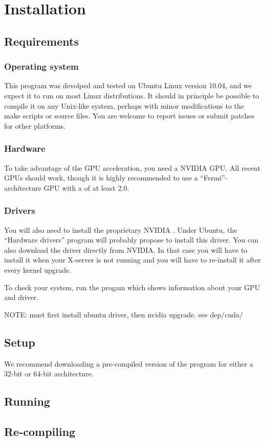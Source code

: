 \section{Installation}

\subsection{Requirements}

\subsubsection{Operating system}

This program was devolped and tested on Ubuntu Linux version 10.04, and we expect it to run on most Linux distributions. It should in principle be possible to compile it on any Unix-like system, perhaps with minor modifications to the make scripts or source files. You are welcome to report issues or submit patches for other platforms.

\subsubsection{Hardware}

To take advantage of the GPU acceleration, you need a  \textsc{NVIDIA} GPU. All recent GPUs should work, though it is highly recommended to use a ``Fermi''-architecture GPU with a  of at least 2.0.

\subsubsection{Drivers}

You will also need to install the proprietary \textsc{NVIDIA} . Under Ubuntu, the ``Hardware drivers'' program will probably propose to install this driver. You can also download the driver directly from \textsc{NVIDIA}. In that case you will have to install it when your X-server is not running and you will have to re-install it after every kernel upgrade.

To check your system, run the progam  which shows information about your GPU and driver.

NOTE: must first install ubuntu driver, then nvidia upgrade. see dep/cuda/
\subsection{Setup}

We recommend downloading a pre-compiled version of the program for either a 32-bit or 64-bit architecture.

\subsection{Running}

\subsection{Re-compiling}




